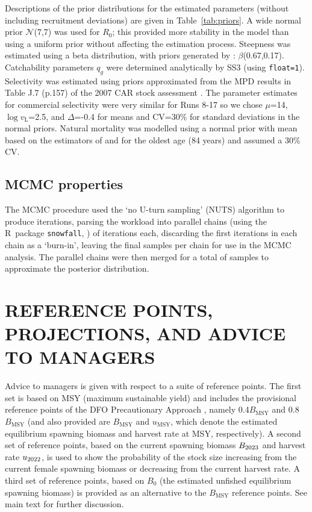 \documentclass[11pt]{book}
\newcommand{\Norm}{\mathcal{N}}%
\newcommand{\Bmsy}{B_\text{MSY}}
\newcommand{\umsy}{u_\text{MSY}}
\newcommand{\pc}{\%}
\newcommand{\code}[1]{\normalsize\texttt{#1}\normalsize}%
\begin{document}
Descriptions of the prior distributions for the estimated parameters (without including recruitment deviations) are given in Table~\ref{tab:priors}.
A wide normal prior $\Norm$(7,7) was used for $R_0$; this provided more stability in the model than using a uniform prior without affecting the estimation process.
Steepness was estimated using a beta distribution, with priors generated by \citet{Forrest-etal:2010}: $\beta$(0.67,0.17).
Catchability parameters $q_g$ were determined analytically by SS3 (using \code{float=1}).
Selectivity was estimated using priors approximated from the MPD results in Table J.7 (p.157) of the 2007 CAR stock assessment \citep{Stanley-etal:2009_car}.
The parameter estimates for commercial selectivity were very similar for Runs 8-17 so we chose $\mu$=14, $\log v_\text{L}$=2.5, and $\Delta$=-0.4 for means and CV=30\pc{} for standard deviations in the normal priors.
Natural mortality was modelled using a normal prior with mean based on the estimators of \citet{Hoenig:1983} and \citet{Gertseva:2018_pcom} for the oldest age (84 years) and assumed a 30\pc{} CV.

\subsection{MCMC properties}

The MCMC procedure used the `no U-turn sampling' (NUTS) algorithm \citep{Monnahan-Kristensen:2018, Monnahan-etal:2019} to produce \nSims{} iterations, parsing the workload into \nChains{} parallel chains (using the R~package \code{snowfall}, \citealt{R:2015_snowfall}) of \cSims{} iterations each, discarding the first \cBurn{} iterations in each chain as a `burn-in', leaving the final \cSamps{} samples per chain for use in the MCMC analysis.
The parallel chains were then merged for a total of \Nmcmc{} samples to approximate the posterior distribution.

\section{REFERENCE POINTS, PROJECTIONS, AND ADVICE TO MANAGERS}

Advice to managers is given with respect to a suite of reference points.
The first set is based on MSY (maximum sustainable yield) and includes the provisional reference points of the DFO Precautionary Approach \citep{DFO-SAR:2006_pa}, namely 0.4$\Bmsy$ and 0.8$\Bmsy$ (and also provided are $\Bmsy$ and $\umsy$, which denote the estimated equilibrium spawning biomass and harvest rate at MSY, respectively). 
A second set of reference points, based on the current spawning biomass $B_{2023}$ and harvest rate $u_{2022}$, is used to show the probability of the stock size increasing from the current female spawning biomass or decreasing from the current harvest rate.
A third set of reference points, based on $B_0$ (the estimated unfished equilibrium spawning biomass) is provided as an alternative to the $\Bmsy$ reference points.
See main text for further discussion.
\end{document}
